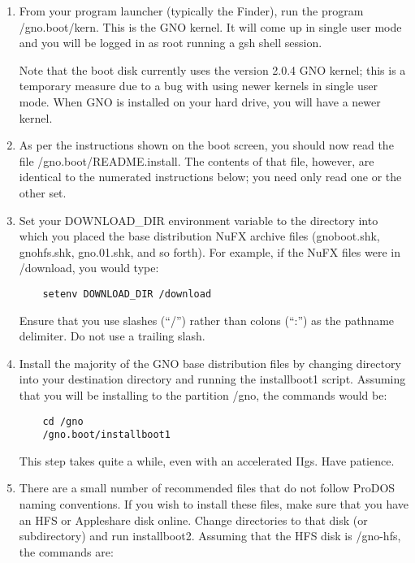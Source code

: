 \documentclass{report}
\begin{document}
\begin{enumerate}


\item
From your program launcher (typically the Finder), run the program
/gno.boot/kern.
This is the GNO kernel.  It will come up in 
single user mode and you will be logged in as root running a 
gsh
shell session.

Note that the boot disk currently uses the version 2.0.4 GNO kernel; this
is a temporary measure due to a bug with using newer kernels in single user
mode.  When GNO is installed on your hard drive, you will have a newer
kernel.

\item
As per the instructions shown on the boot screen, you should now read the
file /gno.boot/README.install.  The contents of that file, however, are
identical to the numerated instructions below; you need only read one or
the other set.

\item
Set your DOWNLOAD\_DIR environment variable to the directory
into which you placed the base distribution NuFX archive files
(gnoboot.shk, gnohfs.shk, gno.01.shk, and so forth).
For example, if the NuFX files were in /download, you would type:

\begin{verbatim}
	setenv DOWNLOAD_DIR /download
\end{verbatim}

Ensure that you use slashes (``/'') rather than colons (``:'') as the
pathname delimiter.  Do not use a trailing slash.

\item
Install the majority of the GNO base distribution files by
changing directory into your destination directory and running the
installboot1
script. Assuming that you will be installing
to the partition 
/gno,
the commands would be:

\begin{verbatim}
	cd /gno
	/gno.boot/installboot1
\end{verbatim}

This step takes quite a while, even with an accelerated IIgs.
Have patience.

\item
There are a small number of recommended files that do not follow
ProDOS naming conventions.  If you wish to install these files,
make sure that you have an HFS or Appleshare disk online. Change
directories to that disk (or subdirectory) and run 
installboot2.
Assuming that the HFS disk is 
/gno-hfs,
the commands are:


\end{enumerate}
\end{document}
